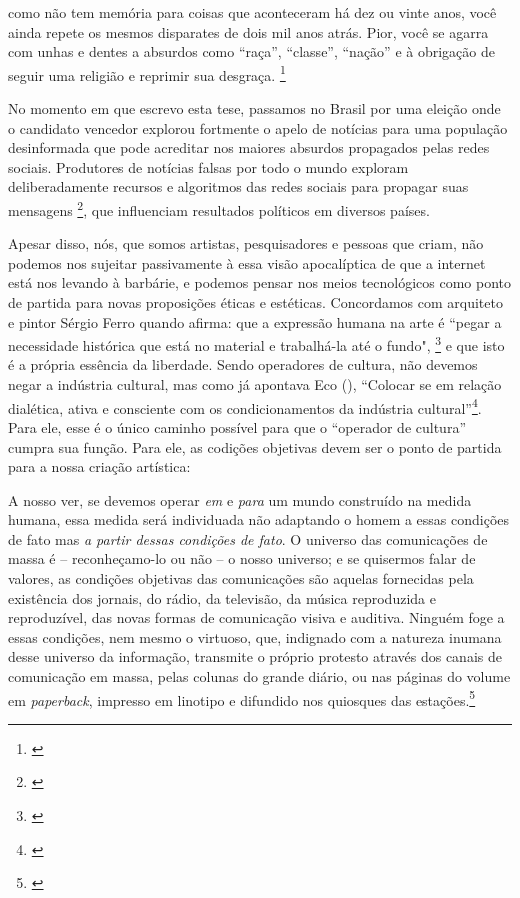 \begin{citacao}
como não tem memória para coisas que aconteceram há dez ou vinte anos, você ainda repete os mesmos disparates de dois mil anos atrás. Pior, você se agarra com unhas e dentes a absurdos como ``raça'', ``classe'', ``nação'' e à obrigação de seguir uma religião e reprimir sua desgraça. \footnote{\cite[101]{reich1998escute}}
\end{citacao}

No momento em que escrevo esta tese, passamos no Brasil por uma eleição onde o candidato vencedor explorou fortmente o apelo de notícias para uma população desinformada que pode acreditar nos maiores absurdos propagados pelas redes sociais. Produtores de notícias falsas por todo o mundo exploram deliberadamente recursos e algoritmos das redes sociais para propagar suas mensagens \footnote{\cite{Martens2018}}, que influenciam resultados políticos em diversos países.

Apesar disso, nós, que somos artistas, pesquisadores e pessoas que criam, não podemos nos sujeitar passivamente à essa visão apocalíptica de que a internet está nos levando à barbárie, e podemos pensar nos meios tecnológicos como ponto de partida para novas proposições éticas e estéticas. Concordamos com arquiteto e pintor Sérgio Ferro quando afirma: que a expressão humana na arte é ``pegar a necessidade histórica que está no material e trabalhá-la até o fundo", \footnote{\cite{FerroSergio2002}} e que isto é a própria essência da liberdade. Sendo operadores de cultura, não devemos negar a indústria cultural, mas como já apontava Eco (\citeyear{Eco1970}), ``Colocar se em relação dialética, ativa e consciente com os condicionamentos da indústria cultural''\footnote{\cite[14]{Eco1970}}. Para ele, esse é o único caminho possível para que o ``operador de cultura'' cumpra sua função. Para ele, as codições objetivas devem ser o ponto de partida para a nossa criação artística: 



\begin{citacao}
A nosso ver, se devemos operar \emph{em} e \emph{para} um mundo construído na medida humana, essa medida será individuada não adaptando o homem a essas condições de fato mas \emph{a partir dessas condições de fato}. O universo das comunicações de massa é -- reconheçamo-lo ou não -- o nosso universo; e se quisermos falar de valores, as condições objetivas das comunicações são aquelas fornecidas pela existência dos jornais, do rádio, da televisão, da música reproduzida e reproduzível, das novas formas de comunicação visiva e auditiva. Ninguém foge a essas condições, nem mesmo o virtuoso, que, indignado com a natureza inumana desse universo da informação, transmite o próprio protesto através dos canais de comunicação em massa, pelas colunas do grande diário, ou nas páginas do volume em \emph{paperback}, impresso em linotipo e difundido nos quiosques das estações.\footnote{\cite[13]{Eco1970}}

\end{citacao}

